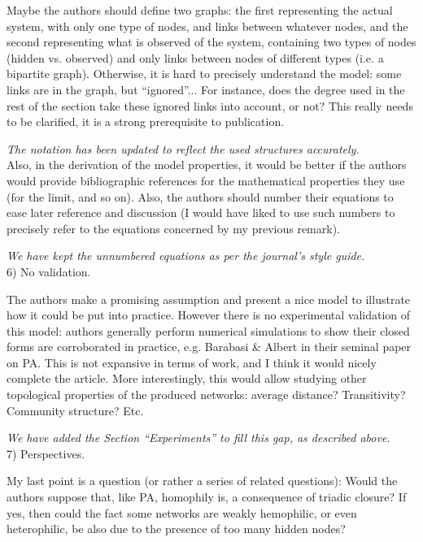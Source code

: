 \documentclass{article}
\begin{document}
Maybe the authors should define two graphs: the first representing the
actual system, with only one type of nodes, and links between whatever
nodes, and the second representing what is observed of the system,
containing two types of nodes (hidden vs. observed) and only links
between nodes of different types (i.e. a bipartite graph). Otherwise, it
is hard to precisely understand the model: some links are in the graph,
but ``ignored''... For instance, does the degree used in the rest of the
section take these ignored links into account, or not? This really needs
to be clarified, it is a strong prerequisite to publication. 

\textit{The notation has been updated to reflect the used structures
  accurately. } \\

Also, in the derivation of the model properties, it would be better if
the authors would provide bibliographic references for the mathematical
properties they use (for the limit, and so on). Also, the authors should
number their equations to ease later reference and discussion (I would
have liked to use such numbers to precisely refer to the equations
concerned by my previous remark). 

\textit{ We have kept the unnumbered equations as per the journal's style
  guide. } \\

6) No validation.

The authors make a promising assumption and present a nice model to
illustrate how it could be put into practice. However there is no
experimental validation of this model: authors generally perform
numerical simulations to show their closed forms are corroborated in
practice, e.g. Barabasi \& Albert in their seminal paper on PA. This is
not expansive in terms of work, and I think it would nicely complete the
article. More interestingly, this would allow studying other topological
properties of the produced networks: average distance? Transitivity?
Community structure? Etc. 

\textit{ We have added the Section ``Experiments'' to fill this gap, as described above. } \\

7) Perspectives.

My last point is a question (or rather a series of related questions):
Would the authors suppose that, like PA, homophily is, a consequence of
triadic closure? If yes, then could the fact some networks are weakly
hemophilic, or even heterophilic, be also due to the presence of too
many hidden nodes? 
\end{document}
